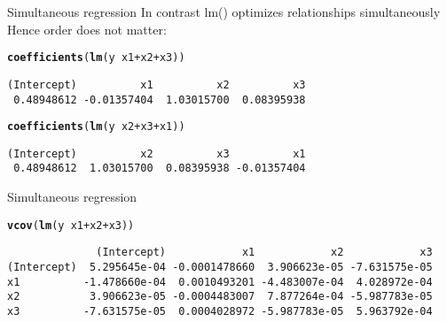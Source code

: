 \documentclass[10pt]{beamer}\usepackage[]{graphicx}\usepackage[]{color}
\makeatletter
\newcommand{\hlopt}[1]{\textcolor[rgb]{0,0,0}{#1}}%
\newcommand{\hlstd}[1]{\textcolor[rgb]{0.345,0.345,0.345}{#1}}%
\newcommand{\hlkwd}[1]{\textcolor[rgb]{0.737,0.353,0.396}{\textbf{#1}}}%
\newenvironment{kframe}{%
 \def\at@end@of@kframe{}%
 \ifinner\ifhmode%
  \def\at@end@of@kframe{\end{minipage}}%
  \begin{minipage}{\columnwidth}%
 \fi\fi%
 \def\FrameCommand##1{\hskip\@totalleftmargin \hskip-\fboxsep
 \colorbox{shadecolor}{##1}\hskip-\fboxsep
     \hskip-\linewidth \hskip-\@totalleftmargin \hskip\columnwidth}%
 \MakeFramed {\advance\hsize-\width
   \@totalleftmargin\z@ \linewidth\hsize
   \@setminipage}}%
 {\par\unskip\endMakeFramed%
 \at@end@of@kframe}
\newenvironment{knitrout}{}{} %
\makeatother
\begin{document}
\begin{frame}[fragile]{Simultaneous regression}
In contrast lm() optimizes relationships simultaneously\\
Hence order does not matter:
\begin{knitrout}\small
{}\color{fgcolor}\begin{kframe}
\begin{alltt}
  \hlkwd{coefficients}\hlstd{(}\hlkwd{lm}\hlstd{(y} \hlopt{~} \hlstd{x1} \hlopt{+} \hlstd{x2} \hlopt{+} \hlstd{x3))}
\end{alltt}
\begin{verbatim}
(Intercept)          x1          x2          x3 
 0.48948612 -0.01357404  1.03015700  0.08395938 
\end{verbatim}
\begin{alltt}
  \hlkwd{coefficients}\hlstd{(}\hlkwd{lm}\hlstd{(y} \hlopt{~} \hlstd{x2} \hlopt{+} \hlstd{x3} \hlopt{+} \hlstd{x1))}
\end{alltt}
\begin{verbatim}
(Intercept)          x2          x3          x1 
 0.48948612  1.03015700  0.08395938 -0.01357404 
\end{verbatim}
\end{kframe}
\end{knitrout}

\end{frame}

\begin{frame}[fragile]{Simultaneous regression}

\begin{knitrout}\small
{}\color{fgcolor}\begin{kframe}
\begin{alltt}
    \hlkwd{vcov}\hlstd{(}\hlkwd{lm}\hlstd{(y} \hlopt{~} \hlstd{x1} \hlopt{+} \hlstd{x2} \hlopt{+} \hlstd{x3))}
\end{alltt}
\begin{verbatim}
              (Intercept)            x1            x2            x3
(Intercept)  5.295645e-04 -0.0001478660  3.906623e-05 -7.631575e-05
x1          -1.478660e-04  0.0010493201 -4.483007e-04  4.028972e-04
x2           3.906623e-05 -0.0004483007  7.877264e-04 -5.987783e-05
x3          -7.631575e-05  0.0004028972 -5.987783e-05  5.963792e-04
\end{verbatim}
\end{kframe}
\end{knitrout}
\end{frame}
\end{document}
